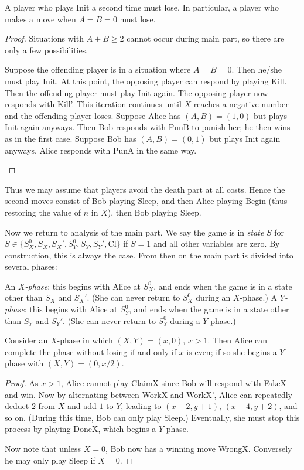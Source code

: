 \documentclass[11pt]{scrartcl}
\begin{document}
\begin{claim*}
  A player who plays Init a second time must lose.
  In particular, a player who makes a move when $A=B=0$ must lose.
\end{claim*}
\begin{proof}
  Situations with $A+B \ge 2$ cannot occur during main part,
  so there are only a few possibilities.
  \begin{itemize}
  \ii Suppose the offending player is in a situation where $A=B=0$.
  Then he/she must play Init.
  At this point, the opposing player can respond by playing Kill.
  Then the offending player must play Init again.
  The opposing player now responds with Kill'.
  This iteration continues until $X$ reaches a negative number
  and the offending player loses.
  \ii Suppose Alice has $(A,B) = (1,0)$ but plays Init again anyways.
  Then Bob responds with PunB to punish her; he then wins as in the first case.
  \ii Suppose Bob has $(A,B) = (0,1)$ but plays Init again anyways.
  Alice responds with PunA in the same way. \qedhere
  \end{itemize}
\end{proof}

Thus we may assume that players avoid the death part at all costs.
Hence the second moves consist of Bob playing Sleep,
and then Alice playing Begin
(thus restoring the value of $n$ in $X$), then Bob playing Sleep.

Now we return to analysis of the main part.
We say the game is in \emph{state} $S$ for
$S \in \{S_X^0, S_X, S_X', S_Y^0, S_Y, S_Y', \text{Cl} \}$
if $S = 1$ and all other variables are zero.
By construction, this is always the case.
From then on the main part is divided into several phases:
\begin{itemize}
  \ii An \emph{$X$-phase}: this begins with Alice at $S_X^0$, and
  ends when the game is in a state other than $S_X$ and $S_X'$.
  (She can never return to $S_X^0$ during an $X$-phase.)
  \ii A \emph{$Y$-phase}: this begins with Alice at $S_Y^0$, and
  ends when the game is in a state other than $S_Y$ and $S_Y'$.
  (She can never return to $S_Y^0$ during a $Y$-phase.)
\end{itemize}

\begin{claim*}
Consider an $X$-phase in which $(X,Y) = (x,0)$, $x > 1$.
Then Alice can complete the phase without losing if and only if $x$ is even;
if so she begins a $Y$-phase with $(X,Y) = (0,x/2)$.
\end{claim*}
\begin{proof}
As $x >1$, Alice cannot play ClaimX since Bob will respond with FakeX and win.
Now by alternating between WorkX and WorkX',
Alice can repeatedly deduct $2$ from $X$ and add $1$ to $Y$,
leading to $(x-2,y+1)$, $(x-4,y+2)$, and so on.
(During this time, Bob can only play Sleep.)
Eventually, she must stop this process by playing DoneX, which begins a $Y$-phase.

Now note that unless $X=0$, Bob now has a winning move WrongX.
Conversely he may only play Sleep if $X=0$.
\end{proof}
\end{document}
